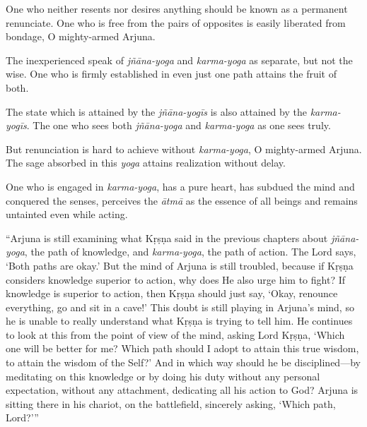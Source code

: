 {One who neither resents nor desires anything should be known as a permanent renunciate. One who is free from the pairs of opposites is easily liberated from bondage, O mighty-armed Arjuna.}

{The inexperienced speak of \textit{jñāna-yoga} and \textit{karma-yoga} as separate, but not the wise. One who is firmly established in even just one path attains the fruit of both.}

{The state which is attained by the \textit{jñāna-yogīs} is also attained by the \textit{karma-yogīs}. The one who sees both \textit{jñāna-yoga} and \textit{karma-yoga} as one sees truly.}

{But renunciation is hard to achieve without \textit{karma-yoga}, O mighty-armed Arjuna. The sage absorbed in this \textit{yoga} attains realization without delay.}

{One who is engaged in \textit{karma-yoga}, has a pure heart, has subdued the mind and conquered the senses, perceives the \textit{ātmā} as the essence of all beings and remains untainted even while acting.}

\enquote{Arjuna is still examining what Kṛṣṇa said in the previous chapters about \textit{jñāna-yoga}, the path of knowledge, and \textit{karma-yoga}, the path of action. The Lord says, \enquote{Both paths are okay.} But the mind of Arjuna is still troubled, because if Kṛṣṇa considers knowledge superior to action, why does He also urge him to fight? If knowledge is superior to action, then Kṛṣṇa should just say, \enquote{Okay, renounce everything, go and sit in a cave!} This doubt is still playing in Arjuna’s mind, so he is unable to really understand what Kṛṣṇa is trying to tell him. He continues to look at this from the point of view of the mind, asking Lord Kṛṣṇa, \enquote{Which one will be better for me? Which path should I adopt to attain this true wisdom, to attain the wisdom of the Self?} And in which way should he be disciplined---by meditating on this knowledge or by doing his duty without any personal expectation, without any attachment, dedicating all his action to God? Arjuna is sitting there in his chariot, on the battlefield, sincerely asking, \enquote{Which path, Lord?}}

